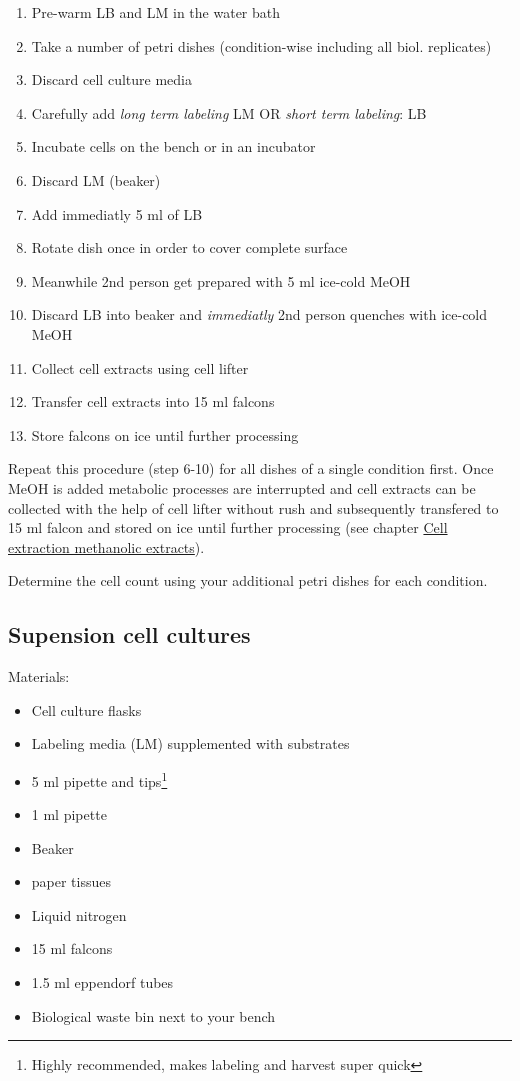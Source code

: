 \documentclass[]{book}
\providecommand{\tightlist}{%
  \setlength{\itemsep}{0pt}\setlength{\parskip}{0pt}}
\let\rmarkdownfootnote\footnote%
\def\footnote{\protect\rmarkdownfootnote}
\theoremstyle{definition}
\theoremstyle{definition}
\theoremstyle{definition}
\theoremstyle{remark}
\begin{document}
\begin{enumerate}
\def\labelenumi{\arabic{enumi}.}
\tightlist
\item
  Pre-warm LB and LM in the water bath
\item
  Take a number of petri dishes (condition-wise including all biol.
  replicates)
\item
  Discard cell culture media
\item
  Carefully add \emph{long term labeling} LM OR \emph{short term
  labeling}: LB
\item
  Incubate cells on the bench or in an incubator
\item
  Discard LM (beaker)
\item
  Add immediatly 5 ml of LB
\item
  Rotate dish once in order to cover complete surface
\item
  Meanwhile 2nd person get prepared with 5 ml ice-cold MeOH
\item
  Discard LB into beaker and \emph{immediatly} 2nd person quenches with
  ice-cold MeOH
\item
  Collect cell extracts using cell lifter
\item
  Transfer cell extracts into 15 ml falcons
\item
  Store falcons on ice until further processing
\end{enumerate}

Repeat this procedure (step 6-10) for all dishes of a single condition
first. Once MeOH is added metabolic processes are interrupted and cell
extracts can be collected with the help of cell lifter without rush and
subsequently transfered to 15 ml falcon and stored on ice until further
processing (see chapter \protect\hyperlink{ccextraction_meoh}{Cell
extraction methanolic extracts}).

Determine the cell count using your additional petri dishes for each
condition.

\hypertarget{psirm:suspension}{\subsection{Supension cell
cultures}\label{psirm:suspension}}

Materials:

\begin{itemize}
\tightlist
\item
  Cell culture flasks
\item
  Labeling media (LM) supplemented with substrates
\item
  5 ml pipette and tips\footnote{Highly recommended, makes labeling and
    harvest super quick}
\item
  1 ml pipette
\item
  Beaker
\item
  paper tissues
\item
  Liquid nitrogen
\item
  15 ml falcons
\item
  1.5 ml eppendorf tubes
\item
  Biological waste bin next to your bench
\end{itemize}
\end{document}
